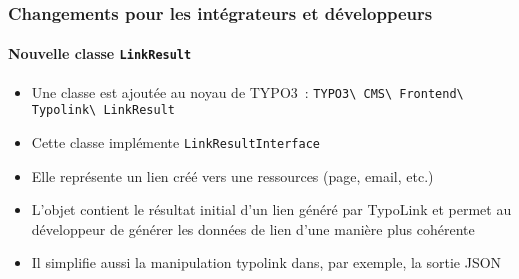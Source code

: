 %

\begin{frame}[fragile]
	\frametitle{Changements pour les intégrateurs et développeurs}
	\framesubtitle{Nouvelle classe \texttt{LinkResult}}


	\begin{itemize}
		\item Une classe est ajoutée au noyau de TYPO3~:\newline
			\small\texttt{TYPO3\textbackslash
				CMS\textbackslash
				Frontend\textbackslash
				Typolink\textbackslash
				LinkResult}\normalsize
		\item Cette classe implémente \texttt{LinkResultInterface}
		\item Elle représente un lien créé vers une ressources (page, email, etc.)
		\item L'objet contient le résultat initial d'un lien généré par TypoLink
			et permet au développeur de générer les données de lien d'une manière plus cohérente
		\item Il simplifie aussi la manipulation typolink dans, par exemple, la sortie JSON
	\end{itemize}

\end{frame}

